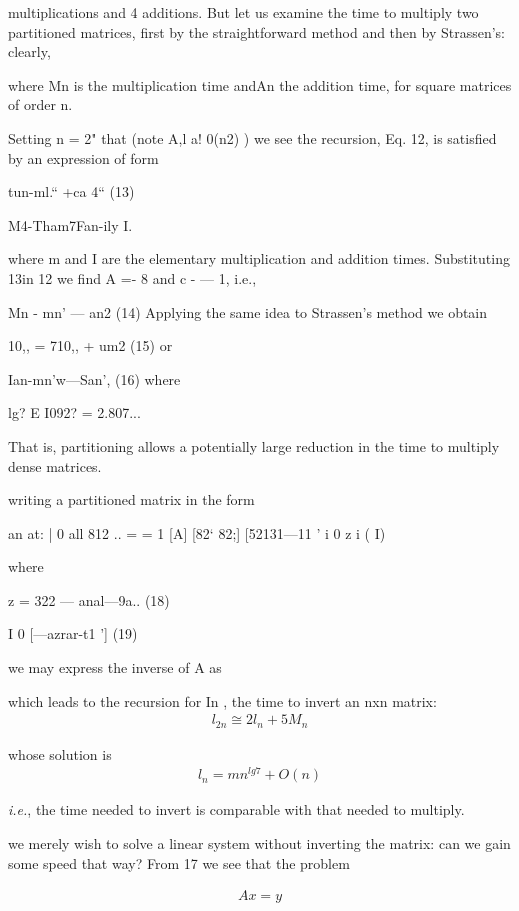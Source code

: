 {{{{{\begin{itemize}
{{{{{{{{{{{{{{{multiplications and 4 additions. But let us examine the time to
multiply two partitioned matrices, first by the straightforward
method and then by Strassen's: clearly,

where Mn is the multiplication time andAn the addition time, for
square matrices of order n.

Setting n = 2" that (note A,l a! 0(n2) ) we see the recursion,
Eq. 12, is satisfied by an expression of form

tun-ml.“ +ca 4“ (13)

M4-Tham7Fan-ily I.

where m and I are the elementary multiplication and addition
times. Substituting 13in 12 we find A =- 8 and c - — 1, i.e.,

Mn - mn’ — an2 (14)
Applying the same idea to Strassen’s method we obtain

10,, = 710,, + um2 (15)
or

Ian-mn’w—San’, (16)
where

lg? E I092? = 2.807...

That is, partitioning allows a potentially large reduction in the
time to multiply dense matrices.

 writing a partitioned matrix in the form

an at: | 0 all 812 ..
= = 1
[A] [82‘ 82;] [52131—11 ' i 0 z i ( I)

where

 

z = 322 — anal—9a.. (18)

I 0
[—azrar-t1 '] (19)

we may express the inverse of A as

which leads to the recursion for In , the time to invert an nxn
matrix:
\begin{align}
l_{2n} \cong 2l_{n} + 5M_{n}
\end{align} 

whose solution is
\begin{align}
l_{n} = mn^{lg 7} + O(n)
\end{align}

\textit{i.e.}, the time needed to invert is comparable with that needed to multiply.

 we merely wish to solve a linear system without inverting the matrix: can we gain some speed that way? From 17 we
see that the problem

\begin{align*}
Ax=y
\end{align*}

}}}}}}}}}}}}}}}
\end{itemize}}}}}}
